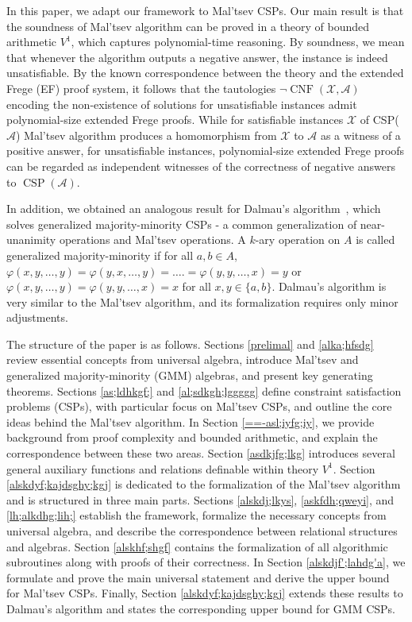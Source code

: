 \documentclass{article}
\theoremstyle{definition}
\theoremstyle{theorem}
\theoremstyle{theorem}
\theoremstyle{remark}
\theoremstyle{remark}
\theoremstyle{example}
\theoremstyle{notation}
\theoremstyle{theorem}
\begin{document}
In this paper, we adapt our framework to Mal’tsev CSPs. Our main result is that the soundness of Mal'tsev algorithm can be proved in a theory of bounded arithmetic $V^1$, which captures polynomial-time reasoning. By soundness, we mean that whenever the algorithm outputs a negative answer, the instance is indeed unsatisfiable. By the known correspondence between the theory and the extended Frege (EF) proof system, it follows that the tautologies $\neg\operatorname{CNF}(\mathcal{X}, \mathcal{A})$ encoding the non-existence of solutions for unsatisfiable instances admit polynomial-size extended Frege proofs. While for satisfiable instances $\mathcal{X}$ of CSP($\mathcal{A}$) Mal'tsev algorithm produces a homomorphism from $\mathcal{X}$ to $\mathcal{A}$ as a witness of a positive answer, for unsatisfiable instances, polynomial-size extended Frege proofs can be regarded as independent witnesses of the correctness of negative answers to $\operatorname{CSP}(\mathcal{A})$. 

In addition, we obtained an analogous result for Dalmau's algorithm~\cite{lmcs:2237}, which solves generalized majority-minority CSPs - a common generalization of near-unanimity operations and Mal’tsev operations. A $k$-ary operation on $A$ is called generalized majority-minority if for all $a,b\in A$, $\varphi(x,y,\ldots,y)= \varphi(y,x,\ldots,y)=\ldots .= \varphi(y,y,\ldots,x)= y$ or $\varphi(x,y,\ldots,y) = \varphi(y,y,\ldots,x) = x$ for all $x,y\in\{a,b\}$. Dalmau's algorithm is very similar to the Mal’tsev algorithm, and its formalization requires only minor adjustments. 

The structure of the paper is as follows. Sections \ref{prelimal} and \ref{alka;hfsdg} review essential concepts from universal algebra, introduce Mal’tsev and generalized majority-minority (GMM) algebras, and present key generating theorems. Sections \ref{as;ldhkgf;} and \ref{al;sdkgh;lggggg} define constraint satisfaction problems (CSPs), with particular focus on Mal’tsev CSPs, and outline the core ideas behind the Mal’tsev algorithm. In Section \ref{==-asl;iyfg;iy}, we provide background from proof complexity and bounded arithmetic, and explain the correspondence between these two areas. Section \ref{asdkjfg;lkg} introduces several general auxiliary functions and relations definable within theory $V^1$. Section \ref{alskdyf;kajdsghy;kgj} is dedicated to the formalization of the Mal’tsev algorithm and is structured in three main parts. Sections \ref{alskdj;lkys}, \ref{askfdh;qweyi}, and \ref{lh;alkdhg;lih;} establish the framework, formalize the necessary concepts from universal algebra, and describe the correspondence between relational structures and algebras. Section \ref{alskhf;shgf} contains the formalization of all algorithmic subroutines along with proofs of their correctness. In Section \ref{alskdjf';lahdg'a}, we formulate and prove the main universal statement and derive the upper bound for Mal’tsev CSPs. Finally, Section \ref{alskdyf;kajdsghy;kgj} extends these results to Dalmau's algorithm and states the corresponding upper bound for GMM CSPs.
\end{document}

